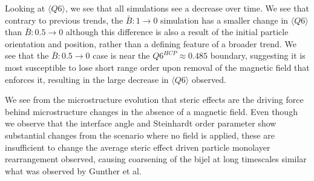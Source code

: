 Looking at \(\langle Q6 \rangle\), we see that all simulations see a
decrease over time. We see that contrary to previous trends, the
\(\bar{B}: 1\rightarrow 0\) simulation has a smaller change in
\(\langle Q6 \rangle\) than \(\bar{B}: 0.5\rightarrow 0\) although this
difference is also a result of the initial particle orientation and
position, rather than a defining feature of a broader trend. We see that
the \(\bar{B}: 0.5\rightarrow 0\) case is near the
\(Q6^{HCP} \approx 0.485\) boundary, suggesting it is most susceptible
to lose short range order upon removal of the magnetic field that
enforces it, resulting in the large decrease in \(\langle Q6 \rangle\)
observed.

We see from the microstructure evolution that steric effects are the
driving force behind microstructure changes in the absence of a magnetic
field. Even though we observe that the interface angle and Steinhardt
order parameter show substantial changes from the scenario where no
field is applied, these are insufficient to change the average steric
effect driven particle monolayer rearrangement observed, causing
coarsening of the bijel at long timescales similar what was observed by
Gunther et al.~\cite{gunther_timescales_2014}
